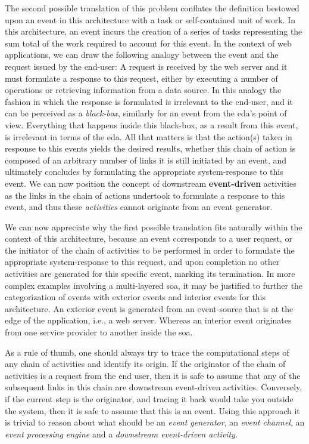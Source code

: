 \documentclass[12pt, titlepage]{uo_temp}
\begin{document}
     The second possible translation of this problem conflates the definition bestowed
     upon an event in this architecture with a task or self-contained unit of work. In
     this architecture, an event incurs the creation of a series of tasks representing the
     sum total of the work required to account for this event. In the context of web
     applications, we can draw the following analogy between the event and the request
     issued by the end-user: A request is received by the web server and it must formulate
     a response to this request, either by executing a number of operations or retrieving
     information from a data source. In this analogy the fashion in which the response is
     formulated is irrelevant to the end-user, and it can be perceived as a
     \emph{black-box}, similarly for an event from the \gls{eda}'s point of
     view. Everything that happens inside this black-box, as a result from this event, is
     irrelevant in terms of the \gls{eda}. All that matters is that the action(s) taken in
     response to this events yields the desired results, whether this chain of action is
     composed of an arbitrary number of links it is still initiated by an event, and
     ultimately concludes by formulating the appropriate system-response to this event. We can
     now position the concept of downstream \textbf{event-driven} activities as the links
     in the chain of actions undertook to formulate a response to this event, and thus
     these \emph{activities} cannot originate from an event generator.
     
     We can now appreciate why the first possible translation fits naturally within the
     context of this architecture, because an event corresponds to a user request, or the
     initiator of the chain of activities to be performed in order to formulate the
     appropriate system-response to this request, and upon completion no other activities
     are generated for this specific event, marking its termination. In more complex
     examples involving a multi-layered \gls{soa}, it may be justified to further the
     categorization of events with exterior events and interior events for this
     architecture. An exterior event is generated from an event-source that is at the edge
     of the application, i.e., a web server. Whereas an interior event originates from one
     service provider to another inside the \gls{soa}.
     
     As a rule of thumb, one should always try to trace the computational steps of any
     chain of activities and identify its origin. If the originator of the chain of
     activities is a request from the end user, then it is safe to assume that any of the
     subsequent links in this chain are downstream event-driven activities. Conversely, if
     the current step is the originator, and tracing it back would take you outside the
     system, then it is safe to assume that this is an event. Using this approach it is
     trivial to reason about what should be an \emph{event generator}, an \emph{event
       channel}, an \emph{event processing engine} and a \emph{downstream event-driven
       activity}.
     
\end{document}
